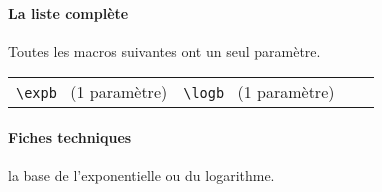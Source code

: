 \documentclass[12pt,a4paper]{article}
\begin{document}
            \paragraph{La liste complète}

Toutes les macros suivantes ont un seul paramètre.

\medskip


\begin{tabular*}{\textwidth}{@{\extracolsep{\fill}}*{4}{l}}
    \verb+\expb+ \, (1 paramètre) & \verb+\logb+ \, (1 paramètre) &  & \\
\end{tabular*}




            \paragraph{Fiches techniques}



\IDarg{} la base de l'exponentielle ou du logarithme.
\end{document}
